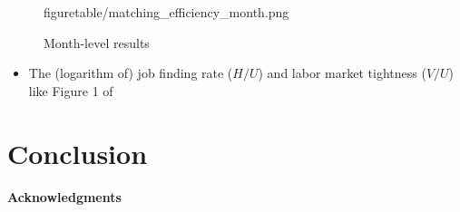 \documentclass[12pt]{article}
\begin{document}
\begin{figure}[!ht]
\begin{center}
{  {figuretable/matching_efficiency_month.png}}
  \caption{Month-level results}
  \label{fg:month_level_results} 
  \end{center}
  \footnotesize
\end{figure} 

\begin{itemize}
    \item The (logarithm of) job finding rate ($H/U$) and labor market tightness ($V/U$) like Figure 1 of \cite{borowczyk2013accounting}
    
\end{itemize}

\section{Conclusion}


\paragraph{Acknowledgments}





\end{document}
